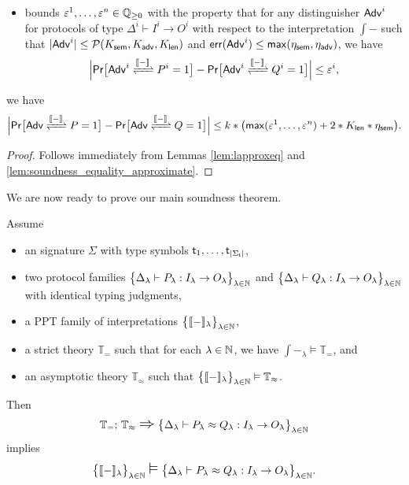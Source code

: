 \begin{corollary}
\begin{itemize}
\item bounds $\varepsilon^1,\ldots,\varepsilon^n \in \mathbb{Q}_{\geq 0}$ with the property that for any distinguisher $\mathsf{Adv}^i$ for protocols of type $\Delta^i \vdash I^i \to O^i$ with respect to the interpretation $\int{-}$ such that $|\mathsf{Adv}^i| \leq \mathcal{P}(K_{\mathsf{sem}},K_{\mathsf{adv}},K_{\mathsf{len}})$ and $\mathsf{err}(\mathsf{Adv}^i) \leq \mathsf{max}(\eta_{\mathsf{sem}},\eta_{\mathsf{adv}})$, we have
\[\Big|\mathsf{Pr}\big[\interaction{\Adv^i}{P^i}{\int{-}} = 1\big] - \mathsf{Pr}\big[\interaction{\Adv^i}{Q^i}{\int{-}} = 1\big]\Big| \leq \varepsilon^i,\]
\end{itemize}
we have
\[\Big|\mathsf{Pr}\big[\interaction{\Adv}{P}{\int{-}} = 1\big] - \mathsf{Pr}\big[\interaction{\Adv}{Q}{\int{-}} = 1\big]\Big| \leq k * \big(\max(\varepsilon^1,\ldots,\varepsilon^n) + 2 * K_\length * \eta_\sem\big).\]
\end{corollary}

\begin{proof}
Follows immediately from Lemmas \ref{lem:lapproxeq} and \ref{lem:soundness_equality_approximate}.
\end{proof}


\noindent We are now ready to prove our main soundness theorem.

\begin{theorem}
Assume
\begin{itemize}
\item an \ipdl signature $\Sigma$ with type symbols $\mathsf{t}_1,\ldots,\mathsf{t}_{|\Sigma_\mathsf{t}|}$,

\item two protocol families $\big\{\Delta_\lambda \vdash P_\lambda : I_\lambda \to O_\lambda\big\}_{\lambda \in \mathbb{N}}$ and $\big\{\Delta_\lambda \vdash Q_\lambda : I_\lambda \to O_\lambda\big\}_{\lambda \in \mathbb{N}}$ with identical typing judgments,

\item a PPT family of interpretations $\big\{\llbracket - \rrbracket_\lambda\big\}_{\lambda \in \mathbb{N}}$,

\item a strict \ipdl theory $\mathbb{T}_=$ such that for each $\lambda \in \mathbb{N}$, we have $\int{-}_\lambda \vDash \mathbb{T}_=$, and

\item an asymptotic \ipdl theory $\mathbb{T}_\approx$ such that $\big\{\llbracket - \rrbracket_\lambda\big\}_{\lambda \in \mathbb{N}} \vDash \mathbb{T}_\approx$.
\end{itemize}
Then
\[ \mathbb{T}_=; \, \mathbb{T}_\approx \; \mathlarger{\mathlarger{\Rightarrow}} \; \big\{\Delta_\lambda \vdash P_\lambda \approx Q_\lambda : I_\lambda \to O_\lambda\big\}_{\lambda \in \nat}
\]  
implies
\[\big\{\int{-}_\lambda\big\}_{\lambda \in \nat} \; \mathlarger{\mathlarger{\vDash}} \; \big\{\Delta_\lambda \vdash P_\lambda \approx Q_\lambda : I_\lambda \to O_\lambda\big\}_{\lambda \in \nat}.\]
\end{theorem}

